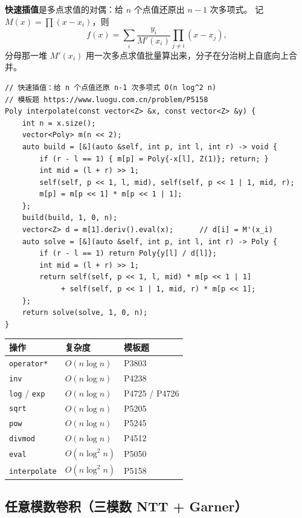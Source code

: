 		\textbf{快速插值}是多点求值的对偶：给 $n$ 个点值还原出 $n-1$ 次多项式。
		记 $M(x) = \prod (x - x_i)$，则
		$$f(x) = \sum_i \frac{y_i}{M'(x_i)} \prod_{j \neq i} (x - x_j),$$
		分母那一堆 $M'(x_i)$ 用一次多点求值批量算出来，分子在分治树上自底向上合并。

		\begin{verbatim}
// 快速插值：给 n 个点值还原 n-1 次多项式 O(n log^2 n)
// 模板题 https://www.luogu.com.cn/problem/P5158
Poly interpolate(const vector<Z> &x, const vector<Z> &y) {
    int n = x.size();
    vector<Poly> m(n << 2);
    auto build = [&](auto &self, int p, int l, int r) -> void {
        if (r - l == 1) { m[p] = Poly{-x[l], Z(1)}; return; }
        int mid = (l + r) >> 1;
        self(self, p << 1, l, mid), self(self, p << 1 | 1, mid, r);
        m[p] = m[p << 1] * m[p << 1 | 1];
    };
    build(build, 1, 0, n);
    vector<Z> d = m[1].deriv().eval(x);      // d[i] = M'(x_i)
    auto solve = [&](auto &self, int p, int l, int r) -> Poly {
        if (r - l == 1) return Poly{y[l] / d[l]};
        int mid = (l + r) >> 1;
        return self(self, p << 1, l, mid) * m[p << 1 | 1]
             + self(self, p << 1 | 1, mid, r) * m[p << 1];
    };
    return solve(solve, 1, 0, n);
}
		\end{verbatim}

		\begin{center}
		\begin{tabular}{lll}
			\hline
			操作 & 复杂度 & 模板题 \\
			\hline
			\texttt{operator*} & $O(n\log n)$ & P3803 \\
			\texttt{inv} & $O(n\log n)$ & P4238 \\
			\texttt{log} / \texttt{exp} & $O(n\log n)$ & P4725 / P4726 \\
			\texttt{sqrt} & $O(n\log n)$ & P5205 \\
			\texttt{pow} & $O(n\log n)$ & P5245 \\
			\texttt{divmod} & $O(n\log n)$ & P4512 \\
			\texttt{eval} & $O(n\log^2 n)$ & P5050 \\
			\texttt{interpolate} & $O(n\log^2 n)$ & P5158 \\
			\hline
		\end{tabular}
		\end{center}

		\subsection{任意模数卷积（三模数 NTT + Garner）}

